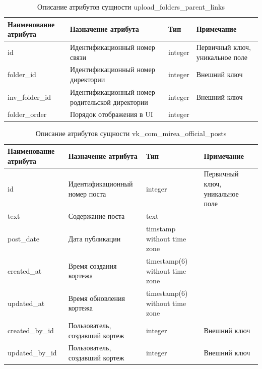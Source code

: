 \documentclass{mirea}
\begin{document}
	\begin{longtable}{ |p{}|p{}|p{}|p{}| } 
		\caption{Описание атрибутов сущности upload\_folders\_parent\_links}
		\endfirsthead
		\endhead
		\hline
		Наименование атрибута & Назначение атрибута & Тип & Примечание \\ \hline
		
		id & Идентификацион\-ный номер связи & integer & Первичный ключ, уникальное поле \\ \hline
		
		folder\_id & Идентификацион\-ный номер директории & integer & Внешний ключ \\ \hline
		
		inv\_folder\_id & Идентификацион\-ный номер родительской директории & integer & Внешний ключ \\ \hline
		
		folder\_order & Порядок отображения в UI & integer & \\ \hline
		
	\end{longtable}

	\begin{longtable}{ |p{}|p{}|p{}|p{}| } 
		\caption{Описание атрибутов сущности vk\_com\_mirea\_official\_posts}
		\endfirsthead
		\endhead
		\hline
		Наименование атрибута & Назначение атрибута & Тип & Примечание \\ \hline
		
		id & Идентификацион\-ный номер поста & integer & Первичный ключ, уникальное поле \\ \hline
		
		text & Содержание поста & text & \\ \hline
		
		post\_date & Дата публикации & timstamp without time zone & \\ \hline
		
		created\_at & Время создания кортежа & timestamp(6) without time zone & \\ \hline
		
		updated\_at & Время обновления кортежа & timestamp(6) without time zone & \\ \hline
		
		created\_by\_id & Пользователь, создавший кортеж & integer & Внешний ключ \\ \hline
		
		updated\_by\_id & Пользователь, создавший кортеж & integer & Внешний ключ \\ \hline
		
	\end{longtable}
\end{document}
